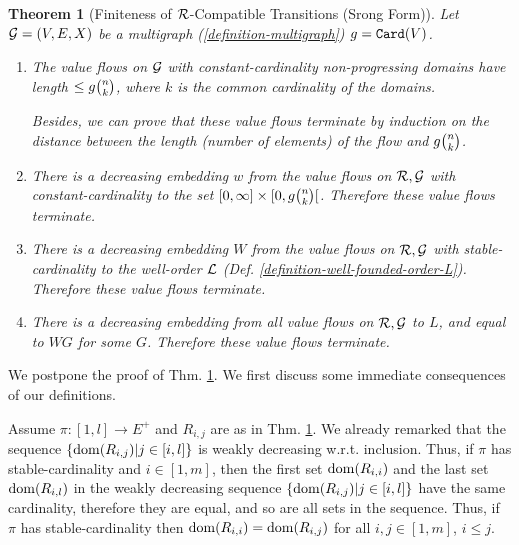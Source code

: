 \documentclass{lmcs}
\newtheorem{theorem}{Theorem}[section]
\begin{document}
 \begin{theorem}[Finiteness of ${\mathcal R}$-Compatible Transitions (Srong Form)]
\label{theorem-finiteness-value-flow-2}
Let ${\mathcal G}=(V,E,X)$ be a multigraph (\ref{definition-multigraph}) 
$g = {\tt Card}(V)$. 
\begin{enumerate}
\item
\label{theorem-finiteness-value-flow-2-1}
The value flows on ${\mathcal G}$ 
with \emph{constant-cardinality non-progressing domains} 
have length $\le g\newton{n}{k}$, where $k$ is 
the common cardinality of the domains.

Besides, we can prove that these value flows terminate 
by induction on the distance
between the length (number of elements)
of the flow and $g\newton{n}{k}$.

\item 
\label{theorem-finiteness-value-flow-2-2}
There is a decreasing embedding $w$ from the value flows on ${\mathcal R}, {\mathcal G}$ 
with \emph{constant-cardinality} to the set 
$[0,\infty] \times [0,g\newton{n}{k}[$. 
Therefore these value flows terminate.

\item
\label{theorem-finiteness-value-flow-2-3}
There is a decreasing embedding $W$ 
from the value flows on ${\mathcal R}, {\mathcal G}$ with 
\emph{stable-cardinality} to the well-order ${\mathcal L}$ 
(Def. \ref{definition-well-founded-order-L}).
Therefore these value flows terminate.

\item
\label{theorem-finiteness-value-flow-2-4}
There is a decreasing embedding from \emph{all} value flows on ${\mathcal R}, {\mathcal G}$ 
to $L$, and equal to $WG$ for some  $G$. 
Therefore these value flows terminate.
\end{enumerate}
\end{theorem}

We postpone the proof of Thm. \ref{theorem-finiteness-value-flow-2}.
We first discuss some immediate consequences of our definitions.

Assume $\pi:[1,l] \rightarrow E^+$ 
and $R_{i,j}$ are as in Thm. \ref{theorem-finiteness-value-flow-2}. We already remarked that 
the sequence $\{{\rm dom}(R_{i,j}) | j \in [i,l]\}$ is weakly decreasing w.r.t. inclusion.
Thus, if $\pi$ has stable-cardinality and $i \in[1,m]$, 
then the first set ${\rm dom}(R_{i,i})$ and the last set ${\rm dom}(R_{i,l})$ in the weakly 
decreasing sequence $\{{\rm dom}(R_{i,j}) | j \in [i,l]\}$ have the same cardinality,
therefore they are equal, and so are all sets in the sequence. 
Thus, if $\pi$ has stable-cardinality then ${\rm dom}(R_{i,i}) = {\rm dom}(R_{i,j})$
for all $i,j \in[1,m]$, $i \le j$.
\end{document}
